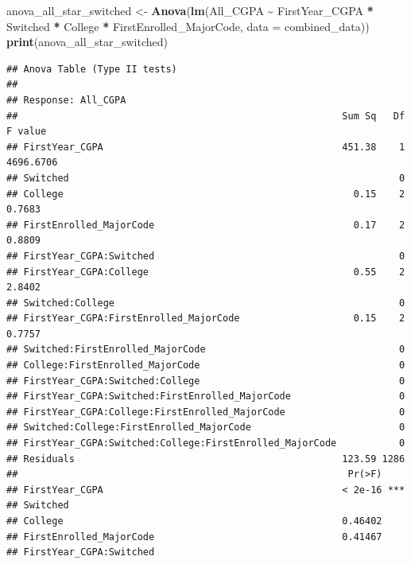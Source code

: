 \documentclass[
  12pt,
]{article}
\newenvironment{Shaded}{\begin{snugshade}}{\end{snugshade}}
\newcommand{\AttributeTok}[1]{\textcolor[rgb]{0.13,0.29,0.53}{#1}}
\newcommand{\FunctionTok}[1]{\textcolor[rgb]{0.13,0.29,0.53}{\textbf{#1}}}
\newcommand{\NormalTok}[1]{#1}
\newcommand{\OtherTok}[1]{\textcolor[rgb]{0.56,0.35,0.01}{#1}}
\newcommand{\SpecialCharTok}[1]{\textcolor[rgb]{0.81,0.36,0.00}{\textbf{#1}}}
\begin{document}
\begin{Shaded}
\begin{Highlighting}[]
\NormalTok{anova\_all\_star\_switched }\OtherTok{\textless{}{-}} \FunctionTok{Anova}\NormalTok{(}\FunctionTok{lm}\NormalTok{(All\_CGPA }\SpecialCharTok{\textasciitilde{}}\NormalTok{ FirstYear\_CGPA }\SpecialCharTok{*}\NormalTok{ Switched }\SpecialCharTok{*}\NormalTok{ College }\SpecialCharTok{*}
\NormalTok{    FirstEnrolled\_MajorCode, }\AttributeTok{data =}\NormalTok{ combined\_data))}
\FunctionTok{print}\NormalTok{(anova\_all\_star\_switched)}
\end{Highlighting}
\end{Shaded}

\begin{verbatim}
## Anova Table (Type II tests)
## 
## Response: All_CGPA
##                                                         Sum Sq   Df   F value
## FirstYear_CGPA                                          451.38    1 4696.6706
## Switched                                                          0          
## College                                                   0.15    2    0.7683
## FirstEnrolled_MajorCode                                   0.17    2    0.8809
## FirstYear_CGPA:Switched                                           0          
## FirstYear_CGPA:College                                    0.55    2    2.8402
## Switched:College                                                  0          
## FirstYear_CGPA:FirstEnrolled_MajorCode                    0.15    2    0.7757
## Switched:FirstEnrolled_MajorCode                                  0          
## College:FirstEnrolled_MajorCode                                   0          
## FirstYear_CGPA:Switched:College                                   0          
## FirstYear_CGPA:Switched:FirstEnrolled_MajorCode                   0          
## FirstYear_CGPA:College:FirstEnrolled_MajorCode                    0          
## Switched:College:FirstEnrolled_MajorCode                          0          
## FirstYear_CGPA:Switched:College:FirstEnrolled_MajorCode           0          
## Residuals                                               123.59 1286          
##                                                          Pr(>F)    
## FirstYear_CGPA                                          < 2e-16 ***
## Switched                                                           
## College                                                 0.46402    
## FirstEnrolled_MajorCode                                 0.41467    
## FirstYear_CGPA:Switched                                            

\end{verbatim}
\end{document}
